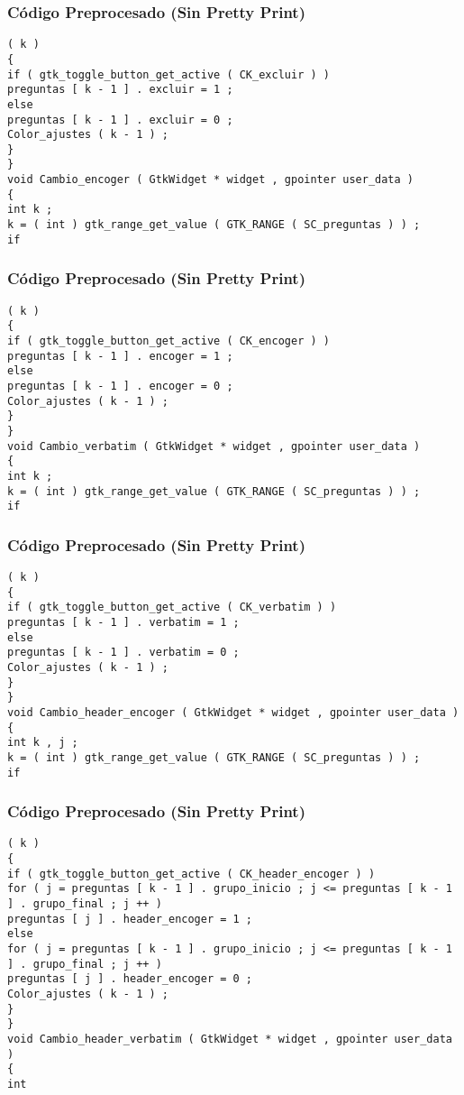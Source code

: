 \documentclass{beamer}
\begin{document}
\begin{frame}[fragile]
\frametitle{C\'odigo Preprocesado (Sin Pretty Print)}
\begin{lstlisting}[style=CStyle]
( k ) 
{ 
if ( gtk_toggle_button_get_active ( CK_excluir ) ) 
preguntas [ k - 1 ] . excluir = 1 ; 
else 
preguntas [ k - 1 ] . excluir = 0 ; 
Color_ajustes ( k - 1 ) ; 
} 
} 
void Cambio_encoger ( GtkWidget * widget , gpointer user_data ) 
{ 
int k ; 
k = ( int ) gtk_range_get_value ( GTK_RANGE ( SC_preguntas ) ) ; 
if \end{lstlisting}
\end{frame}
\begin{frame}[fragile]
\frametitle{C\'odigo Preprocesado (Sin Pretty Print)}
\begin{lstlisting}[style=CStyle]
( k ) 
{ 
if ( gtk_toggle_button_get_active ( CK_encoger ) ) 
preguntas [ k - 1 ] . encoger = 1 ; 
else 
preguntas [ k - 1 ] . encoger = 0 ; 
Color_ajustes ( k - 1 ) ; 
} 
} 
void Cambio_verbatim ( GtkWidget * widget , gpointer user_data ) 
{ 
int k ; 
k = ( int ) gtk_range_get_value ( GTK_RANGE ( SC_preguntas ) ) ; 
if \end{lstlisting}
\end{frame}
\begin{frame}[fragile]
\frametitle{C\'odigo Preprocesado (Sin Pretty Print)}
\begin{lstlisting}[style=CStyle]
( k ) 
{ 
if ( gtk_toggle_button_get_active ( CK_verbatim ) ) 
preguntas [ k - 1 ] . verbatim = 1 ; 
else 
preguntas [ k - 1 ] . verbatim = 0 ; 
Color_ajustes ( k - 1 ) ; 
} 
} 
void Cambio_header_encoger ( GtkWidget * widget , gpointer user_data ) 
{ 
int k , j ; 
k = ( int ) gtk_range_get_value ( GTK_RANGE ( SC_preguntas ) ) ; 
if \end{lstlisting}
\end{frame}
\begin{frame}[fragile]
\frametitle{C\'odigo Preprocesado (Sin Pretty Print)}
\begin{lstlisting}[style=CStyle]
( k ) 
{ 
if ( gtk_toggle_button_get_active ( CK_header_encoger ) ) 
for ( j = preguntas [ k - 1 ] . grupo_inicio ; j <= preguntas [ k - 1 ] . grupo_final ; j ++ ) 
preguntas [ j ] . header_encoger = 1 ; 
else 
for ( j = preguntas [ k - 1 ] . grupo_inicio ; j <= preguntas [ k - 1 ] . grupo_final ; j ++ ) 
preguntas [ j ] . header_encoger = 0 ; 
Color_ajustes ( k - 1 ) ; 
} 
} 
void Cambio_header_verbatim ( GtkWidget * widget , gpointer user_data ) 
{ 
int \end{lstlisting}
\end{frame}
\end{document}
